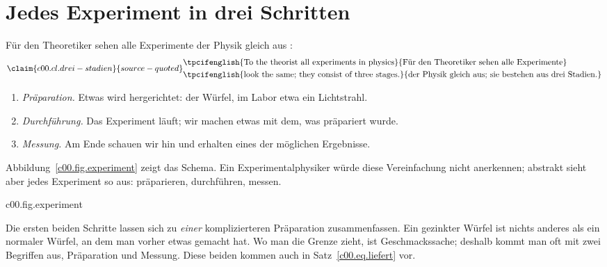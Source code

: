 \section{Jedes Experiment in drei Schritten}\label{c00.s2}

Für den Theoretiker sehen alle Experimente der Physik gleich aus
:
\begin{equation}\label{c00.eq.drei-stadien}\claim{c00.cl.drei-stadien}{source-quoted}
  \begin{aligned}
    &\text{\tpcifenglish{To the theorist all experiments in physics}{Für den Theoretiker sehen alle Experimente}} \\
    &\text{\tpcifenglish{look the same; they consist of three stages.}{der Physik gleich aus; sie bestehen aus drei Stadien.}}
  \end{aligned}
\end{equation}
\begin{enumerate}
  \item \emph{Präparation.} Etwas wird hergerichtet: der Würfel, im Labor etwa ein
    Lichtstrahl.
  \item \emph{Durchführung.} Das Experiment läuft; wir machen etwas mit dem, was
    präpariert wurde.
  \item \emph{Messung.} Am Ende schauen wir hin und erhalten eines der möglichen
    Ergebnisse.
\end{enumerate}
Abbildung~\ref{c00.fig.experiment} zeigt das Schema. Ein Experimentalphysiker würde diese
Vereinfachung nicht anerkennen; abstrakt sieht aber jedes Experiment so aus: präparieren,
durchführen, messen.

\begin{tpcfigure}{c00.fig.experiment}
  \caption{Die drei Stadien eines Experiments. Die Klammer fasst die ersten beiden zu
    einer einzigen Präparation zusammen. Die Präparation ist durchgezogen gezeichnet, die
    Durchführung mit dickerem Strich, die Messung gestrichelt.}
\end{tpcfigure}

Die ersten beiden Schritte lassen sich zu \emph{einer} komplizierteren Präparation
zusammenfassen. Ein gezinkter Würfel ist nichts anderes als ein normaler Würfel, an dem man
vorher etwas gemacht hat. Wo man die Grenze zieht, ist Geschmackssache; deshalb kommt man oft
mit zwei Begriffen aus, Präparation und Messung. Diese beiden kommen auch in
Satz~\eqref{c00.eq.liefert} vor.

